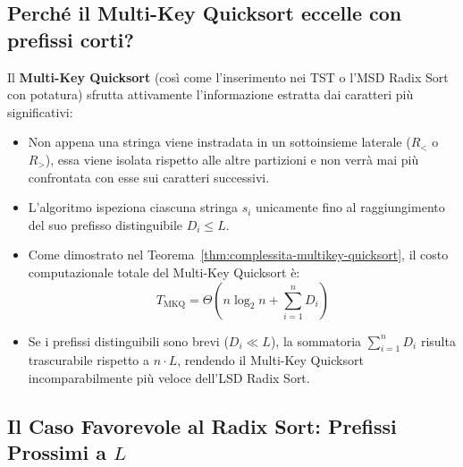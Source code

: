 \FloatBarrier
\subsection{Perché il Multi-Key Quicksort eccelle con prefissi corti?}
\label{subsec:eccellenza-multikey-quicksort}

Il \textbf{Multi-Key Quicksort} (cos\`i come l'inserimento nei TST o l'MSD Radix Sort con potatura) sfrutta attivamente l'informazione estratta dai caratteri pi\`u significativi:
\begin{itemize}
  \item Non appena una stringa viene instradata in un sottoinsieme laterale ($R_{<}$ o $R_{>}$), essa viene isolata rispetto alle altre partizioni e non verr\`a mai pi\`u confrontata con esse sui caratteri successivi.
  \item L'algoritmo ispeziona ciascuna stringa $s_i$ unicamente fino al raggiungimento del suo prefisso distinguibile $D_i \le L$.
  \item Come dimostrato nel Teorema~\ref{thm:complessita-multikey-quicksort}, il costo computazionale totale del Multi-Key Quicksort \`e:
  \begin{equation}
    T_{\text{MKQ}} = \Theta\left( n \log_2 n + \sum_{i=1}^n D_i \right)
  \end{equation}
  \item Se i prefissi distinguibili sono brevi ($D_i \ll L$), la sommatoria $\sum_{i=1}^n D_i$ risulta trascurabile rispetto a $n \cdot L$, rendendo il Multi-Key Quicksort incomparabilmente pi\`u veloce dell'LSD Radix Sort.
\end{itemize}

\FloatBarrier
\subsection{Il Caso Favorevole al Radix Sort: Prefissi Prossimi a $L$}
\label{subsec:caso-favorevole-radix}

